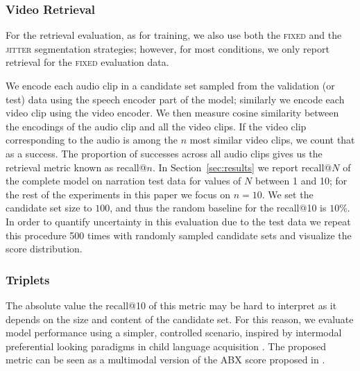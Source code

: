 \subsubsection{Video Retrieval}
\label{sec:retrieval}
For the retrieval evaluation, as for training, we also use both
the \textsc{fixed} and the \textsc{jitter} segmentation strategies;
however, for most conditions, we only report retrieval for the
\textsc{fixed} evaluation data.

We encode each audio clip in a candidate set sampled from the
validation (or test) data using the speech encoder part of the model;
similarly we encode each video clip using the video encoder. We then
measure cosine similarity between the encodings of the audio clip and
all the video clips. If the video clip corresponding to the audio is
among the $n$ most similar video clips, we count that as a
success. The proportion of successes across all audio clips gives us
the retrieval metric known as recall@$n$. In Section~\ref{sec:results} 
we report recall@$N$ of the complete model on narration test data 
for values of $N$ between 1 and 10; for the rest
of the experiments in this paper we focus on $n=10$. 
We set the candidate set size to $100$, and thus
the random baseline for the recall@10 is $10$\%. In order to quantify
uncertainty in this evaluation due to the test data we repeat this
procedure 500 times with randomly sampled candidate sets and visualize
the score distribution.


\subsubsection{Triplets}
\label{sec:triplets}
The absolute value the recall@10 of this metric may be hard to
interpret as it depends on the size and content of the candidate set.
For this reason, we evaluate model performance using a simpler,
controlled scenario, inspired by intermodal preferential looking
paradigms in child language acquisition
\citep{hirsh1996intermodal}. The proposed metric can be seen as a
multimodal version of the ABX score proposed in \citet{schatz2016abx}.


